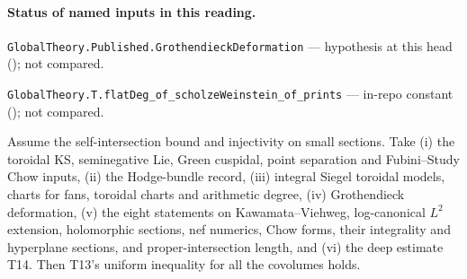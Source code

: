 

\paragraph{Status of named inputs in this reading.}
\noindent\nolinkurl{GlobalTheory.Published.GrothendieckDeformation} --- hypothesis at this head (); not compared.\par
\noindent\nolinkurl{GlobalTheory.T.flatDeg_of_scholzeWeinstein_of_prints} --- in-repo constant (); not compared.\par

\begin{formalstatement}\label{sub:T15}

Assume the self-intersection bound and injectivity on small sections.
Take (i) the toroidal KS, seminegative Lie, Green cuspidal, point
separation and Fubini--Study Chow inputs, (ii) the Hodge-bundle record,
(iii) integral Siegel toroidal models, charts for fans, toroidal charts
and arithmetic degree, (iv) Grothendieck deformation, (v) the eight
statements on Kawamata--Viehweg, log-canonical $L^2$ extension, holomorphic
sections, nef numerics, Chow forms, their integrality and hyperplane
sections, and proper-intersection length, and (vi) the deep estimate T14.
Then T13's uniform inequality for all the covolumes holds.

\end{formalstatement}
